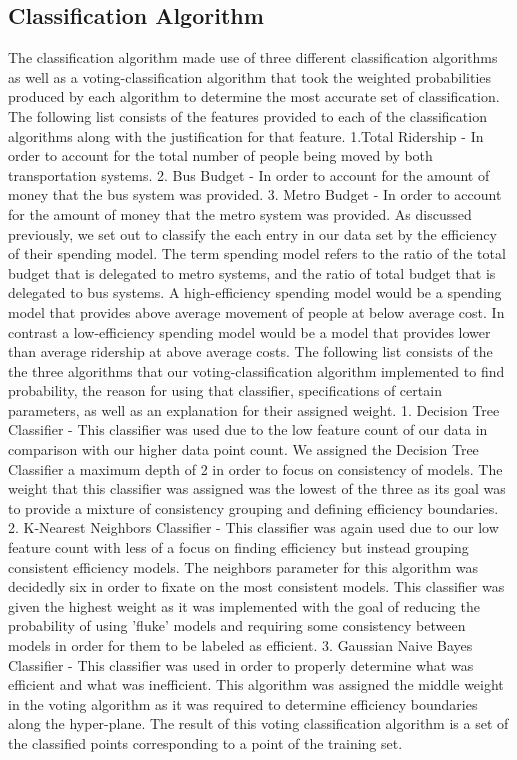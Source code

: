 \documentclass[12pt]{article}
\begin{document}
\begin{multicols}{2}
\subsection{Classification Algorithm}
The classification algorithm made use of three different classification algorithms as well as a voting-classification algorithm that took the weighted probabilities produced by each algorithm to determine the most accurate set of classification. The following list consists of the features provided to each of the classification algorithms along with the justification for that feature. 
1.Total Ridership - In order to account for the total number of people being moved by both transportation systems.
2. Bus Budget - In order to account for the amount of money that the bus system was provided.
3. Metro Budget - In order to account for the amount of money that the metro system was provided.
As discussed previously, we set out to classify the each entry in our data set by the efficiency of their spending model. The term spending model refers to the ratio of the total budget that is delegated to metro systems, and the ratio of total budget that is delegated to bus systems. A high-efficiency spending model would be a spending model that provides above average movement of people at below average cost. In contrast a low-efficiency spending model would be a model that provides lower than average ridership at above average costs.
The following list consists of the the three algorithms that our voting-classification algorithm implemented to find probability, the reason for using that classifier, specifications of certain parameters, as well as an explanation for their assigned weight.
1. Decision Tree Classifier - This classifier was used due to the low feature count of our data in comparison with our higher data point count. We assigned the Decision Tree Classifier a maximum depth of 2 in order to focus on consistency of models. The weight that this classifier was assigned was the lowest of the three as its goal was to provide a mixture of consistency grouping and defining efficiency boundaries.
2. K-Nearest Neighbors Classifier - This classifier was again used due to our low feature count with less of a focus on finding efficiency but instead grouping consistent efficiency models. The neighbors parameter for this algorithm was decidedly six in order to fixate on the most consistent models. This classifier was given the highest weight as it was implemented with the goal of reducing the probability of using 'fluke' models and requiring some consistency between models in order for them to be labeled as efficient.
3. Gaussian Naive Bayes Classifier - This classifier was used in order to properly determine what was efficient and what was inefficient. This algorithm was assigned the middle weight in the voting algorithm as it was required to determine efficiency boundaries along the hyper-plane. 
The result of this voting classification algorithm is a set of the classified points corresponding to a point of the training set. 

\end{multicols}
\end{document}
